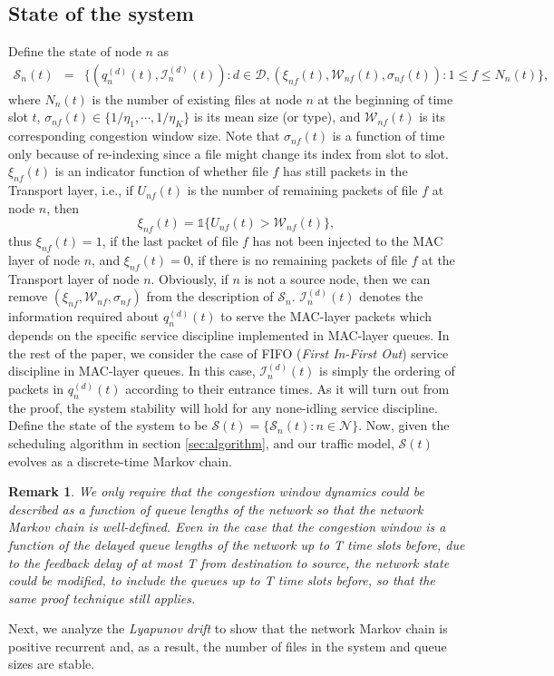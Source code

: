 \documentclass[10pt,onecolumn,draftclsnofoot,journal]{IEEEtran}
\newtheorem{remark}{Remark}
\newcommand{\mD} {\mathcal{D}}
\newcommand{\mS}{\mathcal{S}}
\newcommand{\ben}{\begin{eqnarray*}}
\newcommand{\een}{\end{eqnarray*}}
\begin{document}
\subsection*{State of the system}
Define the state of node $n$ as
\ben
\mS_n(t)&=&\bigl\{(q_n^{(d)}(t),\mathcal{I}_n^{(d)}(t)): d \in \mD, (\xi_{nf}(t), \mathcal{W}_{nf}(t),\sigma_{nf}(t)): 1 \leq f \leq N_n(t)\bigr\},
\een
where $N_n(t)$ is the number of existing files at node $n$ at the beginning of time slot $t$, $\sigma_{nf}(t) \in \{1/\eta_1, \cdots , 1/\eta_K\} $ is its mean size (or type), and $\mathcal{W}_{nf}(t)$ is its corresponding congestion window size. Note that $\sigma_{nf}(t)$ is a function of time only because of re-indexing
since a file might change its index from slot to slot. $\xi_{nf}(t)$ is an indicator function of whether file $f$ has still packets in the Transport layer, i.e., if $U_{nf}(t)$ is the number of remaining packets of file $f$ at node $n$, then
$$\xi_{nf}(t)=\mathds{1} \{U_{nf}(t) > \mathcal{W}_{nf}(t)\},$$
 thus $\xi_{nf}(t) = 1$, if the last packet of file $f$ has not been injected to the MAC layer of node $n$, and $\xi_{nf}(t)=0$, if there is no remaining packets of file $f$ at the Transport layer of node $n$. Obviously, if $n$ is not a source node, then we can remove $(\xi_{nf}, \mathcal{W}_{nf},\sigma_{nf})$ from the description of $\mS_n$. $\mathcal{I}_n^{(d)}(t)$ denotes the information required about $q_n^{(d)}(t)$ to serve the MAC-layer packets which depends on the specific service discipline implemented in MAC-layer queues. In the rest of the paper, we consider the case of FIFO (\textit{First In-First Out}) service discipline in MAC-layer queues. In this case, $\mathcal{I}_n^{(d)}(t)$ is simply the ordering of packets in $q_n^{(d)}(t)$ according to their entrance times. As it will turn out from the proof, the system stability will hold for any none-idling service discipline.
Define the state of the system to be $\mS(t)=\{\mS_n(t): n \in \mathcal{N}\}$. Now, given the scheduling algorithm in section \ref{sec:algorithm}, and our traffic model, $\mS(t)$ evolves as a discrete-time Markov chain.

\begin{remark}
We only require that the congestion window dynamics could be described as a function
of queue lengths of the network so that the network Markov
chain is well-defined. Even in the case that the congestion
window is a function of the delayed queue lengths of the
network up to T time slots before, due to the feedback
delay of at most T from destination to source, the network
state could be modified, to include the queues up to T time
slots before, so that the same proof technique still applies.
\end{remark}
Next, we analyze the \textit{Lyapunov drift} to show that the network Markov chain is positive recurrent and, as a result, the number of files in the system and queue sizes are stable.
\end{document}
